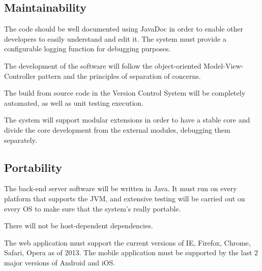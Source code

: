 \subsection{Maintainability}


The code should be well documented using JavaDoc in order to enable other developers to easily understand and edit it.
The system must provide a configurable logging function for debugging purposes.

The development of the software will follow the object-oriented Model-View-Controller pattern and the principles of separation of concerns.

The build from source code in the Version Control System will be completely automated, as well as unit testing execution.

The system will support modular extensions in order to have a stable core and divide the core development from the external modules, debugging them separately.

\subsection{Portability}

The back-end server software will be written in Java. It must run on every platform that supports the JVM, and extensive testing will be carried out on every OS to make sure that the system's really portable.

There will not be host-dependent dependencies.

The web application must support the current versions of IE, Firefox, Chrome, Safari, Opera as of 2013.
The mobile application must be supported by the last 2 major versions of Android and iOS.
